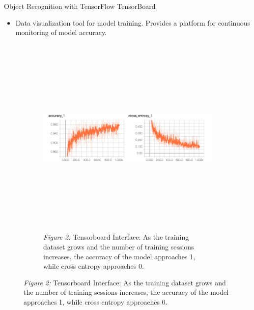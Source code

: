 \documentclass[22pt]{beamer}
\begin{document}
\begin{frame}[fragile]
\begin{textblock}{7.25}
\begin{block}{Object Recognition with TensorFlow}
TensorBoard
\begin{itemize}
\item Data visualization tool for model training. Provides a platform for continuous monitoring of model accuracy. 
\end{itemize}
\begin{figure}[htbp] %
\begin{subfigure}{0.95\textwidth}
   \centering
   \includegraphics[height=10cm]{interface.png}
   \caption*{\textit{Figure 2:} Tensorboard Interface:  As the training dataset grows and the number of training sessions increases, the accuracy of the model approaches 1, while cross entropy approaches 0.}
   \label{fig:interface}
\end{subfigure}
\end{figure}
\end{block}


\end{textblock}
\end{frame}
\end{document}
